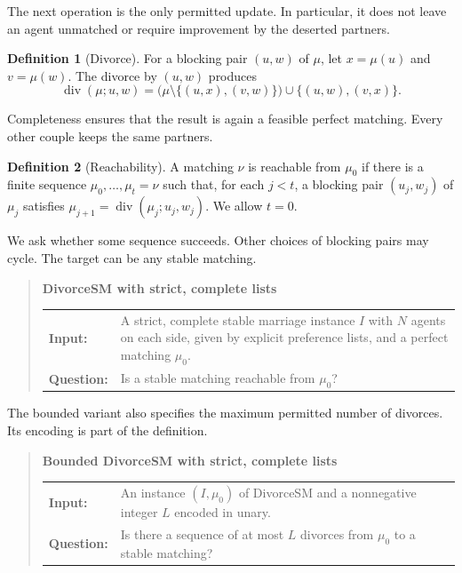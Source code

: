\documentclass[11pt,letterpaper]{article}
\theoremstyle{definition}
\newtheorem{definition}{Definition}
\begin{document}
The next operation is the only permitted update. In particular, it does not leave an agent unmatched or require improvement by the deserted partners.

\begin{definition}[Divorce]
For a blocking pair $(u,w)$ of $\mu$, let $x=\mu(u)$ and $v=\mu(w)$. The divorce by $(u,w)$ produces
\begin{equation}\tag{2}
\operatorname{div}(\mu;u,w)=\bigl(\mu\setminus\{(u,x),(v,w)\}\bigr)\cup\{(u,w),(v,x)\}.
\end{equation}
\end{definition}
Completeness ensures that the result is again a feasible perfect matching. Every other couple keeps the same partners.

\begin{definition}[Reachability]
A matching $\nu$ is reachable from $\mu_0$ if there is a finite sequence $\mu_0,\ldots,\mu_t=\nu$ such that, for each $j<t$, a blocking pair $(u_j,w_j)$ of $\mu_j$ satisfies $\mu_{j+1}=\operatorname{div}(\mu_j;u_j,w_j)$. We allow $t=0$.
\end{definition}

We ask whether some sequence succeeds. Other choices of blocking pairs may cycle. The target can be any stable matching.

\begin{quote}
\noindent\textbf{DivorceSM with strict, complete lists}
\par\medskip
\noindent\begin{tabular}{@{}p{.19\linewidth}p{.74\linewidth}@{}}
\textbf{Input:}& A strict, complete stable marriage instance $I$ with $N$ agents on each side, given by explicit preference lists, and a perfect matching $\mu_0$.\\
\textbf{Question:}& Is a stable matching reachable from $\mu_0$?
\end{tabular}
\end{quote}

The bounded variant also specifies the maximum permitted number of divorces. Its encoding is part of the definition.

\begin{quote}
\noindent\textbf{Bounded DivorceSM with strict, complete lists}
\par\medskip
\noindent\begin{tabular}{@{}p{.19\linewidth}p{.74\linewidth}@{}}
\textbf{Input:}& An instance $(I,\mu_0)$ of DivorceSM and a nonnegative integer $L$ encoded in unary.\\
\textbf{Question:}& Is there a sequence of at most $L$ divorces from $\mu_0$ to a stable matching?
\end{tabular}
\end{quote}
\end{document}
